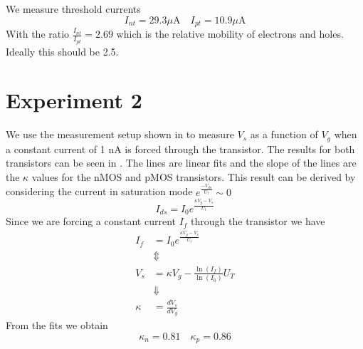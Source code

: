 We measure threshold currents
\begin{equation*}
    I_{nt} = 29.3 \mu \text{A} \quad I_{pt} = 10.9 \mu \text{A}
\end{equation*}
With the ratio \(\frac{I_{nt}}{I_{pt}}=2.69\) which is the relative mobility of electrons and holes. Ideally this should be 2.5.
\section{Experiment 2}
We use the measurement setup shown in  to measure \(V_s\) as a function of \(V_g\) when a constant current of
1 nA is forced through the transistor. The results for both transistors can be seen in . The lines
are linear fits and the slope of the lines are the \(\kappa\) values for the nMOS and pMOS transistors.
This result can be derived by considering the current in saturation mode \(e^{\frac{-V_{ds}}{U_t}} \sim 0\)
\begin{equation*}
    I_{ds} = I_0e^{\frac{\kappa V_g - V_s}{U_t}}
\end{equation*}
Since we are forcing a constant current \(I_f\) through the transistor we have
\begin{align*}
    I_f & = I_0e^{\frac{\kappa V_g - V_s}{U_t}} \\
        &\Updownarrow \\
    V_s &= \kappa V_g - \frac{\ln\left(I_f\right)}{\ln\left(I_0\right)}U_T \\
    &\Downarrow \\
    \kappa &= \frac{d V_s}{d V_g} 
\end{align*}
From the fits we obtain
\begin{equation*}
    \kappa_n = 0.81 \quad \kappa_p = 0.86
\end{equation*}
